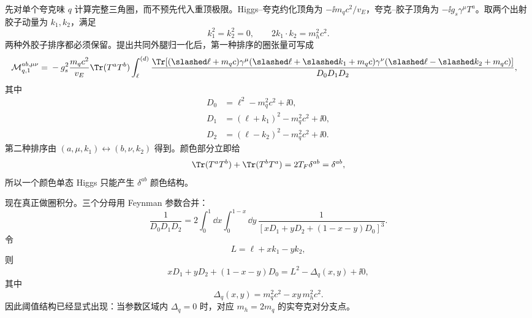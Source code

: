 \begin{derivation}
先对单个夸克味 $q$ 计算完整三角圈，而不预先代入重顶极限。Higgs--夸克约化顶角为 $-\ii m_qc^2/v_E$，夸克--胶子顶角为 $-\ii g_s\gamma^\mu T^a$。取两个出射胶子动量为 $k_1,k_2$，满足
\begin{equation*}
k_1^2=k_2^2=0,
\qquad
2k_1\!\cdot k_2=m_h^2c^2.
\end{equation*}
两种外胶子排序都必须保留。提出共同外腿归一化后，第一种排序的圈张量可写成
\begin{align*}
\mathcal M_{q,1}^{ab,\mu\nu}
={}&-g_s^2\frac{m_qc^2}{v_E}
\Tr(T^aT^b)
\int_\ell^{(d)}
\frac{\Tr\!\left[
(\slashed\ell+m_qc)\gamma^\mu
(\slashed\ell+\slashed k_1+m_qc)\gamma^\nu
(\slashed\ell-\slashed k_2+m_qc)
\right]}
{D_0D_1D_2},
\end{align*}
其中
\begin{align*}
D_0&=\ell^2-m_q^2c^2+\ii0,\\
D_1&=(\ell+k_1)^2-m_q^2c^2+\ii0,\\
D_2&=(\ell-k_2)^2-m_q^2c^2+\ii0.
\end{align*}
第二种排序由 $(a,\mu,k_1)\leftrightarrow(b,\nu,k_2)$ 得到。颜色部分立即给
\begin{equation*}
\Tr(T^aT^b)+\Tr(T^bT^a)
=2T_F\delta^{ab}=\delta^{ab},
\end{equation*}
所以一个颜色单态 Higgs 只能产生 $\delta^{ab}$ 颜色结构。

现在真正做圈积分。三个分母用 Feynman 参数合并：
\begin{equation*}
\frac1{D_0D_1D_2}
=2\int_0^1\dd x\int_0^{1-x}\dd y\,
\frac1{[xD_1+yD_2+(1-x-y)D_0]^3}.
\end{equation*}
令
\begin{equation*}
L=\ell+xk_1-yk_2,
\end{equation*}
则
\begin{equation*}
xD_1+yD_2+(1-x-y)D_0
=L^2-\Delta_q(x,y)+\ii0,
\end{equation*}
其中
\begin{equation*}
\Delta_q(x,y)=m_q^2c^2-xy\,m_h^2c^2.
\end{equation*}
因此阈值结构已经显式出现：当参数区域内 $\Delta_q=0$ 时，对应 $m_h=2m_q$ 的实夸克对分支点。


\end{derivation}
